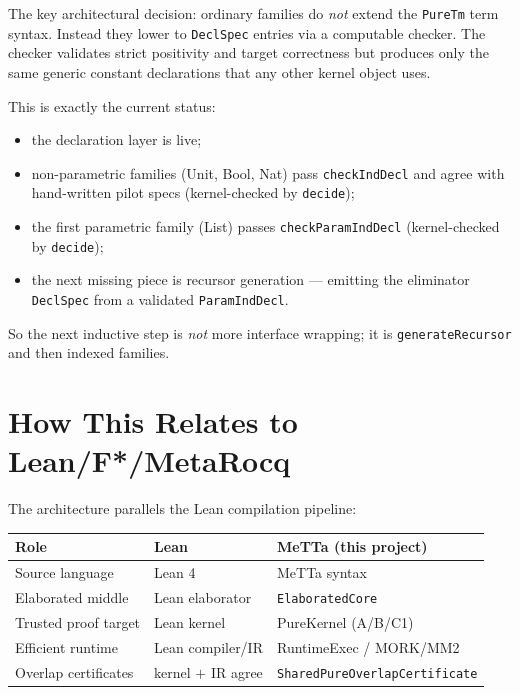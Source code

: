 \documentclass[11pt]{article}
\theoremstyle{remark}
\newcommand{\MeTTa}{\textup{MeTTa}}
\newcommand{\MORK}{\textup{MORK}}
\newcommand{\code}[1]{\texttt{#1}}
\newcommand{\leanref}[1]{\texttt{#1}}
\begin{document}
The key architectural decision: ordinary families do \emph{not} extend the
\leanref{PureTm} term syntax.
Instead they lower to \leanref{DeclSpec} entries via a computable checker.
The checker validates strict positivity and target correctness but produces
only the same generic constant declarations that any other kernel object uses.

\noindent
This is exactly the current status:
\begin{itemize}[nosep]
  \item the declaration layer is live;
  \item non-parametric families (Unit, Bool, Nat) pass \leanref{checkIndDecl}
  and agree with hand-written pilot specs (kernel-checked by \code{decide});
  \item the first parametric family (List) passes \leanref{checkParamIndDecl}
  (kernel-checked by \code{decide});
  \item the next missing piece is recursor generation --- emitting the
  eliminator \leanref{DeclSpec} from a validated \leanref{ParamIndDecl}.
\end{itemize}

\noindent
So the next inductive step is \emph{not} more interface wrapping; it is
\leanref{generateRecursor} and then indexed families.

\section{How This Relates to Lean/F*/MetaRocq}
\label{sec:lean-comparison}

The architecture parallels the Lean compilation pipeline:

\begin{center}
\small
\begin{tabular}{@{}lll@{}}
\toprule
Role & Lean & \MeTTa{} (this project) \\
\midrule
Source language & Lean 4 & \MeTTa{} syntax \\
Elaborated middle & Lean elaborator & \leanref{ElaboratedCore} \\
Trusted proof target & Lean kernel & PureKernel (A/B/C1) \\
Efficient runtime & Lean compiler/IR & RuntimeExec / \MORK{}/MM2 \\
Overlap certificates & kernel $+$ IR agree & \leanref{SharedPureOverlapCertificate} \\
\bottomrule
\end{tabular}
\end{center}
\end{document}
